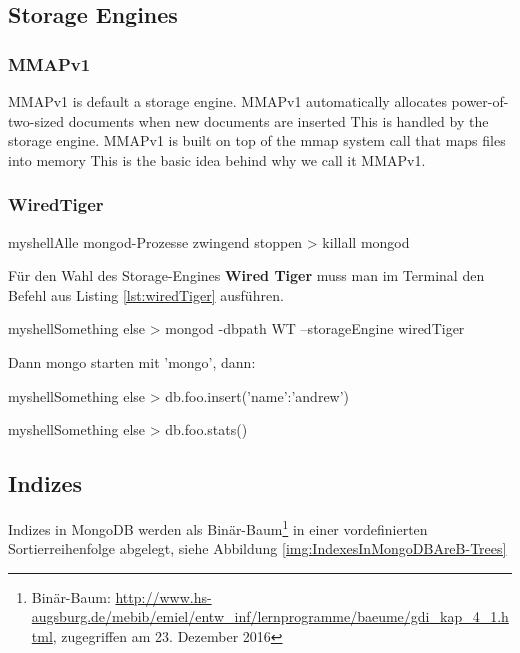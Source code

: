 \subsection{Storage Engines}

\subsubsection{MMAPv1}
MMAPv1 is default a storage engine.
MMAPv1 automatically allocates power-of-two-sized documents when new documents are inserted
This is handled by the storage engine.
MMAPv1 is built on top of the mmap system call that maps files into memory
This is the basic idea behind why we call it MMAPv1.

\subsubsection{WiredTiger}

\begin{listingsboxShell}[label={lst:X}]{myshell}{Alle mongod-Prozesse zwingend stoppen}
> killall mongod
\end{listingsboxShell}

Für den Wahl des Storage-Engines \textbf{Wired Tiger} muss man im Terminal den Befehl aus Listing \ref{lst:wiredTiger} ausführen.

\begin{listingsboxShell}[label={lst:wiredTiger}]{myshell}{Something else}
> mongod -dbpath WT --storageEngine wiredTiger
\end{listingsboxShell}

Dann mongo starten mit 'mongo', dann:

\begin{listingsboxShell}[label={lst:X}]{myshell}{Something else}
> db.foo.insert({'name':'andrew'})
\end{listingsboxShell}

\begin{listingsboxShell}[label={lst:X}]{myshell}{Something else}
> db.foo.stats()
\end{listingsboxShell}

\subsection{Indizes}
Indizes in MongoDB werden als Binär-Baum\footnote{Binär-Baum: \url{http://www.hs-augsburg.de/mebib/emiel/entw_inf/lernprogramme/baeume/gdi_kap_4_1.html}, zugegriffen am 23. Dezember 2016} in einer vordefinierten Sortierreihenfolge abgelegt, siehe Abbildung \ref{img:IndexesInMongoDBAreB-Trees}

